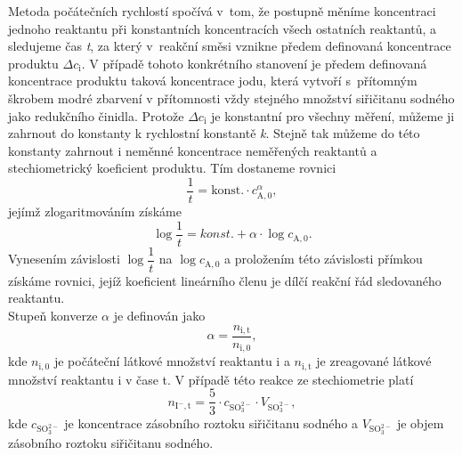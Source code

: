 \documentclass[12pt,a4paper]{article}
\def\ri#1{\mathrm{#1}}
\begin{document}
Metoda počátečních rychlostí spočívá v~tom, že postupně měníme koncentraci jednoho reaktantu při konstantních koncentracích všech ostatních reaktantů, a sledujeme čas \textit{t}, za který v~reakční směsi vznikne předem definovaná koncentrace produktu $\Delta c_\ri{i}$. V případě tohoto konkrétního stanovení je předem definovaná koncentrace produktu taková koncentrace jodu, která vytvoří s~přítomným škrobem modré zbarvení v přítomnosti vždy stejného množství siřičitanu sodného jako redukčního činidla. Protože $\Delta c_\ri{i}$ je konstantní pro všechny měření, můžeme ji zahrnout do konstanty k rychlostní konstantě \textit{k}. Stejně tak můžeme do této konstanty zahrnout i neměnné koncentrace neměřených reaktantů a stechiometrický koeficient produktu. Tím dostaneme rovnici
\begin{equation}
	\dfrac{1}{t} = \ri{konst.}\cdot c_\ri{A, 0}^\alpha,
\end{equation}
jejímž zlogaritmováním získáme
\begin{equation}
	\log \dfrac{1}{t} = konst. + \alpha \cdot \log c_\ri{A, 0}.
\end{equation}
Vynesením závislosti $\log \dfrac{1}{t}$ na $\log c_\ri{A, 0}$ a proložením této závislosti přímkou získáme rovnici, jejíž koeficient lineárního členu je dílčí reakční řád sledovaného reaktantu. \\
Stupeň konverze $\alpha$ je definován jako
\begin{equation}
	\alpha = \dfrac{n_\ri{i, t}}{n_\ri{i, 0}}, 
\end{equation}
kde $n_\ri{i, 0}$ je počáteční látkové množství reaktantu i a $n_\ri{i, t}$ je zreagované látkové množství reaktantu i v čase t. V případě této reakce ze stechiometrie platí 
\begin{equation}
	n_\ri{I^-, t} = \dfrac{5}{3}\cdot c_\ri{SO_3^\ri{2-}}\cdot V_\ri{SO_3^\ri{2-}},
\end{equation}
kde $c_\ri{SO_3^\ri{2-}}$ je koncentrace zásobního roztoku siřičitanu sodného a  $V_\ri{SO_3^\ri{2-}}$ je objem zásobního roztoku siřičitanu sodného.
\end{document}
